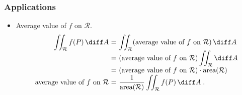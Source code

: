 \begin{frame}
\frametitle{Applications}
\begin{itemize}
\item Average value of $f$ on $\mathcal{R}$.
\[
\begin{array}{r@{~}c@{~}l}
\displaystyle \iint _{ \mathcal{R}} f(P) \, \diff A &=&
\displaystyle \iint_{ \mathcal{R}} (\text{average value of }f \text{ on } \mathcal{R}) \, \diff A \\
&=&\displaystyle (\text{average value of }f \text{ on } \mathcal{R})
\iint_{ \mathcal R} \diff A \\
&=&\displaystyle   (\text{average value of }f \text{ on } \mathcal{R})
\cdot \text{area}(\mathcal{R}) \\
\displaystyle \text{average value of }f \text{ on } \mathcal{R} &=&\displaystyle  \frac{1}{ \text{area}( \mathcal{R} )} \iint_{  \mathcal{R}} f(P) \, \diff A\; .
\end{array}
\]
\end{itemize}
\end{frame}